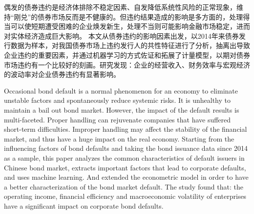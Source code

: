 \begin{cabstract}
	偶发的债券违约是经济体排除不稳定因素、自发降低系统性风险的正常现象，维持“刚兑”的债券市场反而是不健康的。但违约结果造成的影响是多方面的，处理得当可以使短期遭受困难的企业焕发新生，处理不当则可能影响金融市场稳定，进而对实体经济造成巨大影响。
	本文从债券违约的影响因素出发，以2014年来债券发行数据为样本，对我国债券市场上违约发行人的共性特征进行了分析，抽离出导致企业违约的重要因素，并通过机器学习的方式佐证和拓展了计量模型，以期对债券市场违约有一个比较好的刻画。研究发现：企业的经营收入、财务效率与宏观经济的波动率对企业债券违约有显著影响。
\end{cabstract}
\begin{eabstract}
	Occasional bond default is a normal phenomenon for an economy to eliminate unstable factors and spontaneously reduce systemic risks. It is unhealthy to maintain a bail out bond market. However, the impact of the default results is multi-faceted. Proper handling can rejuvenate companies that have suffered short-term difficulties. Improper handling may affect the stability of the financial market, and thus have a huge impact on the real economy.
	Starting from the influencing factors of bond defaults and taking the bond issuance data since 2014 as a sample, this paper analyzes the common characteristics of default issuers in Chinese bond market, extracts important factors that lead to corporate defaults, and uses machine learning. And extended the econometric model in order to have a better characterization of the bond market default. The study found that: the operating income, financial efficiency and macroeconomic volatility of enterprises have a significant impact on corporate bond defaults.
\end{eabstract}
